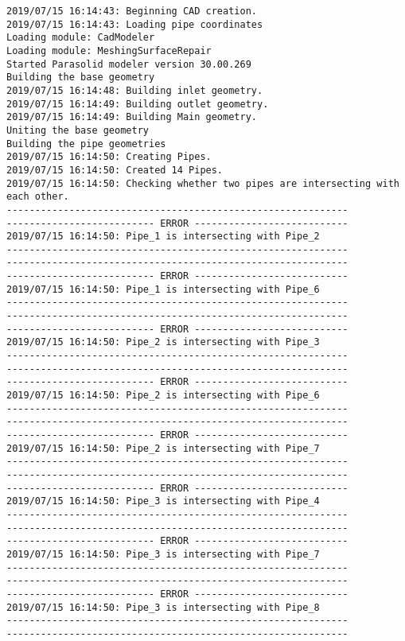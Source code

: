 \documentclass{article}
\begin{document}
{\tiny 
\begin{verbatim}
2019/07/15 16:14:43: Beginning CAD creation.
2019/07/15 16:14:43: Loading pipe coordinates
Loading module: CadModeler
Loading module: MeshingSurfaceRepair
Started Parasolid modeler version 30.00.269
Building the base geometry
2019/07/15 16:14:48: Building inlet geometry.
2019/07/15 16:14:49: Building outlet geometry.
2019/07/15 16:14:49: Building Main geometry.
Uniting the base geometry
Building the pipe geometries
2019/07/15 16:14:50: Creating Pipes.
2019/07/15 16:14:50: Created 14 Pipes.
2019/07/15 16:14:50: Checking whether two pipes are intersecting with each other.
------------------------------------------------------------
-------------------------- ERROR ---------------------------
2019/07/15 16:14:50: Pipe_1 is intersecting with Pipe_2
------------------------------------------------------------
------------------------------------------------------------
-------------------------- ERROR ---------------------------
2019/07/15 16:14:50: Pipe_1 is intersecting with Pipe_6
------------------------------------------------------------
------------------------------------------------------------
-------------------------- ERROR ---------------------------
2019/07/15 16:14:50: Pipe_2 is intersecting with Pipe_3
------------------------------------------------------------
------------------------------------------------------------
-------------------------- ERROR ---------------------------
2019/07/15 16:14:50: Pipe_2 is intersecting with Pipe_6
------------------------------------------------------------
------------------------------------------------------------
-------------------------- ERROR ---------------------------
2019/07/15 16:14:50: Pipe_2 is intersecting with Pipe_7
------------------------------------------------------------
------------------------------------------------------------
-------------------------- ERROR ---------------------------
2019/07/15 16:14:50: Pipe_3 is intersecting with Pipe_4
------------------------------------------------------------
------------------------------------------------------------
-------------------------- ERROR ---------------------------
2019/07/15 16:14:50: Pipe_3 is intersecting with Pipe_7
------------------------------------------------------------
------------------------------------------------------------
-------------------------- ERROR ---------------------------
2019/07/15 16:14:50: Pipe_3 is intersecting with Pipe_8
------------------------------------------------------------
------------------------------------------------------------

\end{verbatim}}
\end{document}
